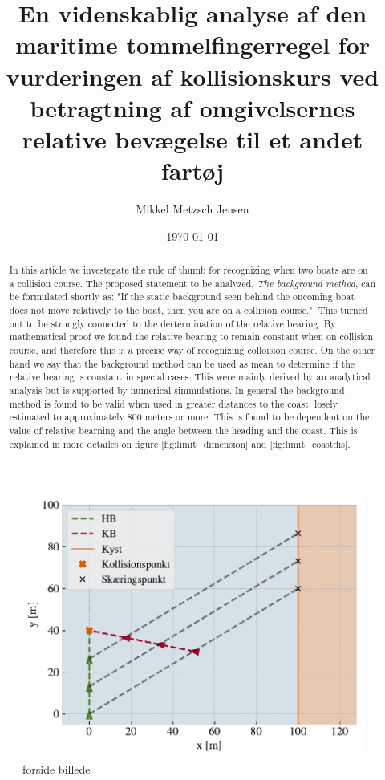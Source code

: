 \documentclass[%
 reprint,
nofootinbib,
aps,
]{revtex4-1}
\begin{document}
\title{En videnskablig analyse af den maritime tommelfingerregel for vurderingen af kollisionskurs ved betragtning af omgivelsernes relative bevægelse til et andet fartøj}
\author{Mikkel Metzsch Jensen}

\date{\today}


\begin{abstract}
  In this article we investegate the rule of thumb for recognizing when two boats are on a collision course. The proposed statement to be analyzed, \textit{The background method}, can be formulated shortly as: "If the static background seen behind the oncoming boat does not move relatively to the boat, then you are on a collision course.". This turned out to be strongly connected to the dertermination of the relative bearing. By mathematical proof we found the relative bearing to remain constant when on collision course, and therefore this is a precise way of recognizing colloision course. On the other hand we say that the background method can be used as mean to determine if the relative bearing is constant in special cases. This were mainly derived by an analytical analysis but is supported by numerical simmulations. In general the background method is found to be valid when used in greater distances to the coast, losely estimated to approximately 800 meters or more. This is found to be dependent on the value of relative bearning and the angle between the heading and the coast. This is explained in more detailes on figure \ref{fig:limit_dimension} and \ref{fig:limit_coastdis}.
\end{abstract}

\maketitle


\onecolumngrid

\begin{figure}[H]
  \centering
  \includegraphics[width=0.8\linewidth]{figures/eksempel1.pdf}
  \caption{forside billede}
  \label{fig:forside}
\end{figure}
\end{document}
